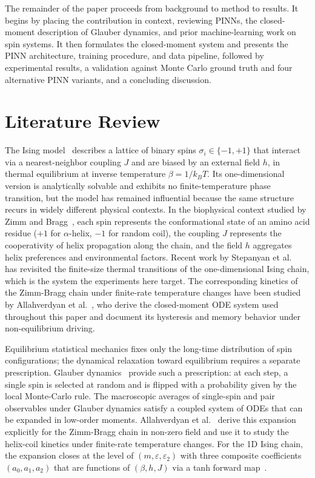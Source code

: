 \documentclass[conference]{IEEEtran}
\newcommand{\eps}{\varepsilon}
\newcommand{\epstwo}{\varepsilon_2}
\begin{document}
The remainder of the paper proceeds from background to method to results.
 It begins by placing the contribution in context, reviewing PINNs, the 
 closed-moment description of Glauber dynamics, and prior machine-learning 
 work on spin systems. It then formulates the closed-moment system and presents
  the PINN architecture, training procedure, and data pipeline, followed by
   experimental results, a validation against Monte Carlo ground truth and
   four alternative PINN variants, and a concluding discussion.

\section{Literature Review}
\label{sec:litreview}


The Ising model~\cite{landau-stat} describes a lattice of binary spins
$\sigma_i \in \{-1, +1\}$ that interact via a nearest-neighbor coupling
$J$ and are biased by an external field $h$, in thermal equilibrium at
inverse temperature $\beta = 1/k_B T$. Its one-dimensional version is
analytically solvable and exhibits no finite-temperature phase transition,
but the model has remained influential because the same
structure recurs in widely different physical contexts. In the
biophysical context studied by Zimm and Bragg~\cite{zimmbragg1959}, each
spin represents the conformational state of an amino acid residue
($+1$ for $\alpha$-helix, $-1$ for random coil), the coupling $J$
represents the cooperativity of helix propagation along the chain, and
the field $h$ aggregates helix preferences and environmental
factors. Recent work by Stepanyan et al.~\cite{stepanyan2024} has revisited
the finite-size thermal transitions of the one-dimensional Ising chain,
which is the system the experiments here target. The corresponding
kinetics of the Zimm-Bragg chain under finite-rate temperature
changes have been studied by Allahverdyan et
al.~\cite{allahverdyan2009kinetics}, who derive the closed-moment
ODE system used throughout this paper and document its hysteresis
and memory behavior under non-equilibrium driving.


Equilibrium statistical mechanics fixes only the long-time distribution
of spin configurations; the dynamical relaxation toward equilibrium
requires a separate prescription. Glauber dynamics~\cite{glauber1963}
provide such a prescription: at each step, a single spin is selected at
random and is flipped with a probability given by the local
Monte-Carlo rule. The macroscopic averages of single-spin and pair
observables under Glauber dynamics satisfy a coupled system of ODEs that
can be expanded in low-order moments. Allahverdyan et
al.~\cite{allahverdyan2009kinetics} derive this expansion explicitly
for the Zimm-Bragg chain in non-zero field and use it to study the
helix-coil kinetics under finite-rate temperature changes. For the
1D Ising chain, the expansion closes at the level of
$(m, \eps, \epstwo)$ with three composite coefficients
$(a_0, a_1, a_2)$ that are functions of $(\beta, h, J)$ via a tanh
forward map~\cite{landau-stat,allahverdyan2009kinetics}.
\end{document}
